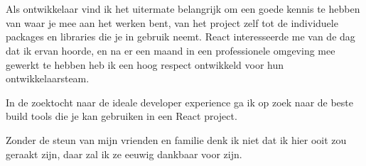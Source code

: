 
\chapter*{}
\label{ch:voorwoord}



Als ontwikkelaar vind ik het uitermate belangrijk om een goede kennis te hebben van waar je mee aan het werken bent, van het project zelf tot de individuele packages en libraries die je in gebruik neemt. React interesseerde me van de dag dat ik ervan hoorde, en na er een maand in een professionele omgeving mee gewerkt te hebben heb ik een hoog respect ontwikkeld voor hun ontwikkelaarsteam.

In de zoektocht naar de ideale developer experience ga ik op zoek naar de beste build tools die je kan gebruiken in een React project.

Zonder de steun van mijn vrienden en familie denk ik niet dat ik hier ooit zou geraakt zijn, daar zal ik ze eeuwig dankbaar voor zijn.
